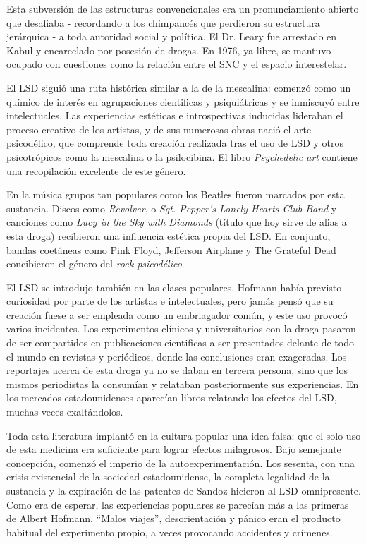 Esta subversión de las estructuras convencionales era un pronunciamiento abierto que desafiaba - recordando a los chimpancés que perdieron su estructura jerárquica - a toda autoridad social y política. El Dr. Leary fue arrestado en Kabul y encarcelado por posesión de drogas. En 1976, ya libre, se mantuvo ocupado con cuestiones como la relación entre el SNC y el espacio interestelar.

El LSD siguió una ruta histórica similar a la de la mescalina: comenzó como un químico de interés en agrupaciones cientificas y psiquiátricas y se inmiscuyó entre intelectuales. Las experiencias estéticas e introspectivas inducidas lideraban el proceso creativo de los artistas, y de sus numerosas obras nació el arte psicodélico, que comprende toda creación realizada tras el uso de LSD y otros psicotrópicos como la mescalina o la psilocibina. El libro \textit{Psychedelic art} contiene una recopilación excelente de este género.

En la música grupos tan populares como los Beatles fueron marcados por esta sustancia. Discos como \textit{Revolver}, o \textit{Sgt. Pepper’s Lonely Hearts Club Band} y canciones como \textit{Lucy in the Sky with Diamonds} (título que hoy sirve de alias a esta droga) recibieron una influencia estética propia del LSD. En conjunto, bandas coetáneas como Pink Floyd, Jefferson Airplane y The Grateful Dead concibieron el género del \textit{rock psicodélico}.

El LSD se introdujo también en las clases populares. Hofmann había previsto curiosidad por parte de los artistas e intelectuales, pero jamás pensó que su creación fuese a ser empleada como un embriagador común, y este uso provocó varios incidentes. Los experimentos clínicos y universitarios con la droga pasaron de ser compartidos en publicaciones cientificas a ser presentados delante de todo el mundo en revistas y periódicos, donde las conclusiones eran exageradas. Los reportajes acerca de esta droga ya no se daban en tercera persona, sino que los mismos periodistas la consumían y relataban posteriormente sus experiencias. En los mercados estadounidenses aparecían libros relatando los efectos del LSD, muchas veces exaltándolos.

Toda esta literatura implantó en la cultura popular una idea falsa: que el solo uso de esta medicina era suficiente para lograr efectos milagrosos. Bajo semejante concepción, comenzó el imperio de la autoexperimentación. Los sesenta, con una crisis existencial de la sociedad estadounidense, la completa legalidad de la sustancia y la expiración de las patentes de Sandoz hicieron al LSD omnipresente. Como era de esperar, las experiencias populares se parecían más a las primeras de Albert Hofmann. \enquote{Malos viajes}, desorientación y pánico eran el producto habitual del experimento propio, a veces provocando accidentes y crímenes.

